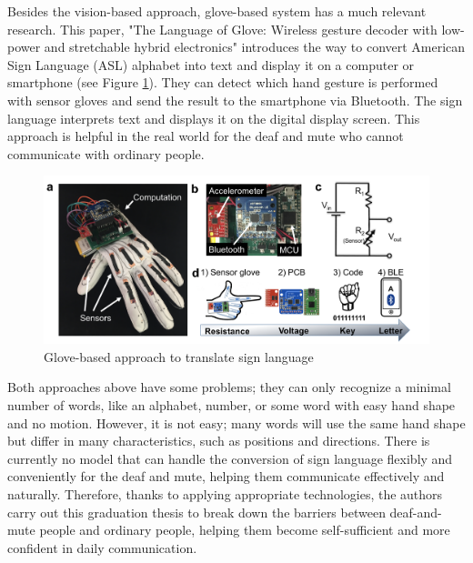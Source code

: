 Besides the vision-based approach, glove-based system has a much relevant research. This paper, "The Language of Glove: Wireless gesture decoder with low-power and stretchable hybrid electronics" \cite{o2017language} introduces the way to convert American Sign Language (ASL) alphabet into text and display it on a computer or smartphone (see Figure \ref{fig:Chap2-Glove-Base}). They can detect which hand gesture is performed with sensor gloves and send the result to the smartphone via Bluetooth. The sign language interprets text and displays it on the digital display screen. This approach is helpful in the real world for the deaf and mute who cannot communicate with ordinary people.

\begin{figure}[H]
  \centering
  \includegraphics[width=\textwidth]{img/Chap2/Glove-Based.png}
  \caption{Glove-based approach to translate sign language}
  \label{fig:Chap2-Glove-Base}
\end{figure}

Both approaches above have some problems; they can only recognize a minimal number of words, like an alphabet, number, or some word with easy hand shape and no motion. However, it is not easy; many words will use the same hand shape but differ in many characteristics, such as positions and directions. There is currently no model that can handle the conversion of sign language flexibly and conveniently for the deaf and mute, helping them communicate effectively and naturally. Therefore, thanks to applying appropriate technologies, the authors carry out this graduation thesis to break down the barriers between deaf-and-mute people and ordinary people, helping them become self-sufficient and more confident in daily communication.

